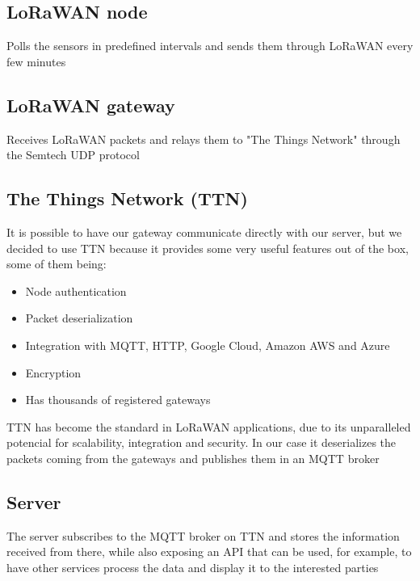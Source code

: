 	\subsection{LoRaWAN node}
		Polls the sensors in predefined intervals and sends them through LoRaWAN every few minutes

	\subsection{LoRaWAN gateway}
		Receives LoRaWAN packets and relays them to "The Things Network" through the Semtech UDP protocol

	\subsection{The Things Network (TTN)}\label{ttn_description}
		It is possible to have our gateway communicate directly with our server, but we decided to use TTN because it provides some very useful features out of the box, some of them being:

		\begin{itemize}
			\item Node authentication
			\item Packet deserialization
			\item Integration with MQTT, HTTP, Google Cloud, Amazon AWS and Azure
			\item Encryption
			\item Has thousands of registered gateways
		\end{itemize}

		TTN has become the standard in LoRaWAN applications, due to its unparalleled potencial for scalability, integration and security. In our case it deserializes the packets coming from the gateways and publishes them in an MQTT broker 

	\subsection{Server}
		The server subscribes to the MQTT broker on TTN and stores the information received from there, while also exposing an API that can be used, for example, to have other services process the data and display it to the interested parties
	
